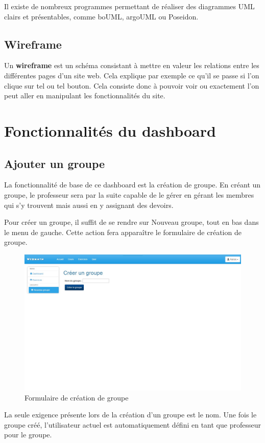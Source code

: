 \documentclass[letterpaper,10pt,french]{sphinxmanual}
\begin{document}
Il existe de nombreux programmes permettant de réaliser des diagrammes UML
clairs et présentables, comme boUML, argoUML ou Poseidon.


\section{Wireframe}
\label{introduction:wireframe}
Un \textbf{wireframe} est un schéma consistant à mettre en valeur les relations entre les
différentes pages d'un site web. Cela explique par exemple ce qu'il se passe si
l'on clique sur tel ou tel bouton. Cela consiste donc à pouvoir voir ou
exactement l'on peut aller en manipulant les fonctionnalités du site.


\chapter{Fonctionnalités du dashboard}
\label{dashboard:fonctionnalites-du-dashboard}\label{dashboard::doc}

\section{Ajouter un groupe}
\label{dashboard:ajouter-un-groupe}
La fonctionnalité de base de ce dashboard est la création de groupe. En créant
un groupe, le professeur sera par la suite capable de le gérer en gérant les
membres qui s'y trouvent mais aussi en y assignant des devoirs.

Pour créer un groupe, il suffit de se rendre sur Nouveau groupe, tout en bas
dans le menu de gauche. Cette action fera apparaître le formulaire de création
de groupe.
\begin{figure}[htbp]
\centering
\capstart

\includegraphics[width=0.700\linewidth]{Newclass.jpg}
\caption{Formulaire de création de groupe}\end{figure}

La seule exigence présente lors de la création d'un groupe est le nom. Une fois
le groupe créé, l'utilisateur actuel est automatiquement défini en tant que
professeur pour le groupe.
\end{document}
